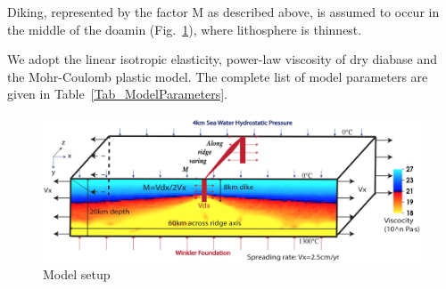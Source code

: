 Diking, represented by the factor M as described above, is assumed to occur in the middle of the doamin (Fig.~\ref{fig_Methods8_1}), where lithosphere is thinnest.

We adopt the linear isotropic elasticity, power-law viscosity of dry diabase \citep[e.g.,][]{Kirby1987, Buck2005} and the Mohr-Coulomb plastic model. The complete list of model parameters are given in Table~\hyperref[Tab_ModelParameters]{\ref{Tab_ModelParameters}}.

\begin{figure}[H]
 \centering
  \includegraphics[width=1.0\textwidth] {./Figures/fig_Methods8_1.png}
 \caption{\small Model setup}
 \label{fig_Methods8_1}
\end{figure}



